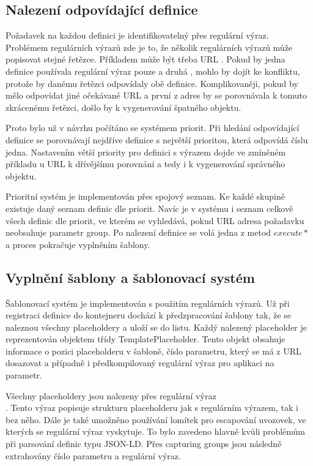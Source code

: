 \documentclass[thesis=B,czech]{FITthesis}[2012/06/26]
\begin{document}
  \subsection{Nalezení odpovídající definice}
  Požadavek na každou definici je identifikovatelný přes regulární výraz. Problémem regulárních výrazů zde je to, že několik regulárních výrazů může popisovat
  stejné řetězce. Příkladem může být třeba URL . Pokud by jedna definice používala regulární výraz pouze  a druhá , mohlo
  by dojít ke konfliktu, protože by danému řetězci odpovídaly obě definice. Komplikovaněji, pokud by  mělo odpovídat jiné očekávané URL
   a první z adres by se porovnávala k tomuto zkrácenému řetězci, došlo by k vygenerování špatného objektu.
  
  Proto bylo už v návrhu počítáno se systémem priorit. Při hledání odpovídající definice se porovnávají nejdříve definice s největší prioritou, která odpovídá číslu jedna.
  Nastavením větší priority pro definici s výrazem  dojde ve zmíněném příkladu u URL  k dřívějšímu porovnání a tedy i 
  k vygenerování správného objektu.
  
  Prioritní systém je implementován přes spojový seznam. Ke každé skupině existuje daný seznam definic dle priorit. Navíc je v systému i seznam celkově všech
  definic dle priorit, ve kterém se vyhledává, pokud URL adresa požadavku neobsahuje parametr group. Po nalezení definice se volá jedna z metod $execute*$ a 
  proces pokračuje vyplněním šablony.
  
  \subsection{Vyplnění šablony a šablonovací systém}
  Šablonovací systém je implementován s použitím regulárních výrazů. Už při registraci definice do kontejneru dochází k předzpracování šablony tak, že se naleznou
  všechny placeholdery a uloží se do listu. Každý nalezený placeholder je reprezentován objektem třídy TemplatePlaceholder. Tento objekt obsahuje informace o pozici
  placeholderu v šabloně, číslo parametru, který se má z URL dosazovat a případně i předkompilovaný regulární výraz pro aplikaci na parametr. 
  
  Všechny placeholdery jsou nalezeny přes regulární výraz \\
  . Tento výraz popisuje strukturu placeholderu jak s regulárním výrazem, tak i bez něho. Dále je také umožněno používání lomítek pro escapování uvozovek,
  ve kterých se regulární výraz vyskytuje. To bylo zavedeno hlavně kvůli problémům při parsování definic typu JSON-LD. Přes capturing groups jsou následně extrahovány
  číslo parametru a regulární výraz.
  
\end{document}
